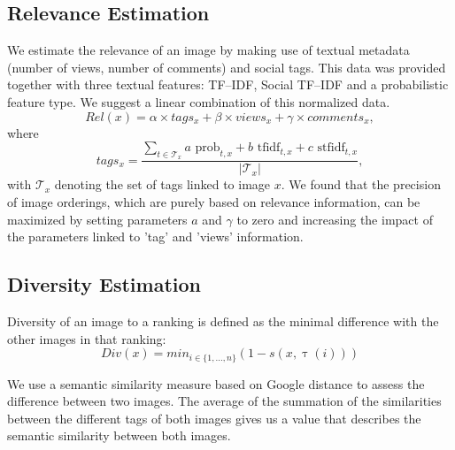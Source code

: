\documentclass{acm_proc_article-me11_tweaked}
\begin{document}
\subsection{Relevance Estimation}
\label{text-relevance}
We estimate the relevance of an image by making use of textual metadata (number of views, number of comments) and social tags.
This data was provided together with three textual features: TF--IDF, Social TF--IDF and a probabilistic feature type.
We suggest a linear combination of this normalized data.
\begin{equation}
Rel(x) = \alpha \times tags_x + \beta \times views_x + \gamma \times comments_x,
\end{equation}
where
\begin{equation}
tags_x = \frac{ \sum_{t \in \mathscr{T}_x} a\text{ prob}_{t,x} + b\text{ tfidf}_{t,x} + c\text{ stfidf}_{t,x}}{|\mathscr{T}_x|} , 
\end{equation}
with $\mathscr{T}_x$ denoting the set of tags linked to image $x$.
We found that the precision of image orderings, which are purely based on relevance information, can be maximized by setting parameters $a$ and $\gamma$ to zero and increasing the impact of the parameters linked to 'tag' and 'views' information.




\subsection{Diversity Estimation}
Diversity of an image to a ranking is defined as the minimal difference with the other images in that ranking:
\begin{equation}
 Div(x) = min_{i \in \{1,\ldots,n\}}\left( 1 - s(x, \uptau(i))\right)
\end{equation}

We use a semantic similarity measure based on Google distance \cite{google-distance} to assess the difference between two images.
The average of the summation of the similarities between the different tags of both images gives us a value that describes the semantic similarity between both images.
\end{document}
